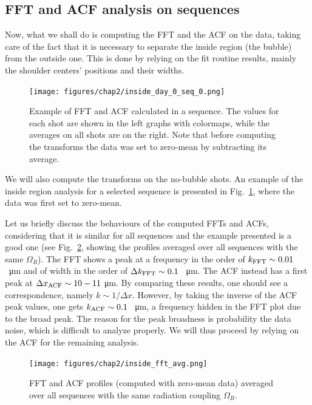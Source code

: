 \subsection{FFT and ACF analysis on sequences}
Now, what we shall do is computing the FFT and the ACF on the data, taking care of the fact that it is necessary to separate the inside region (the bubble) from the outside one. This is done by relying on the fit routine results, mainly the shoulder centers' positions and their widths.
\begin{figure}[h!]
    \centering
    \texttt{[image: figures/chap2/inside\_day\_0\_seq\_0.png]}
    \caption{Example of FFT and ACF calculated in a sequence. The values for each shot are shown in the left graphs with colormaps, while the averages on all shots are on the right. Note that before computing the transforms the data was set to zero-mean by subtracting its average.}
    \label{fig:inside_00}
\end{figure}
We will also compute the transforms on the no-bubble shots. An example of the inside region analysis for a selected sequence is presented in Fig.\ \ref{fig:inside_00}, where the data was first set to zero-mean.

Let us briefly discuss the behaviours of the computed FFTs and ACFs, considering that it is similar for all sequences and the example presented is a good one (see Fig.\ \ref{fig:inside_avg}, showing the profiles averaged over all sequences with the same $\Omega_R$). The FFT shows a peak at a frequency in the order of $k_{\rm FFT} \sim 0.01$ \unit{\per\micro\meter} and of width in the order of $\Delta k_{\rm FFT} \sim 0.1$ \unit{\per\micro\meter}. The ACF instead has a first peak at $\Delta x_{\rm ACF} \sim 10-11$ \unit{\micro\meter}. By comparing these results, one should see a correspondence, namely $k \sim 1/\Delta x$. However, by taking the inverse of the ACF peak values, one gets $k_{\rm ACF} \sim 0.1$ \unit{\per\micro\meter}, a frequency hidden in the FFT plot due to the broad peak. The reason for the peak broadness is probability the data noise, which is difficult to analyze properly. We will thus proceed by relying on the ACF for the remaining analysis.

\begin{figure}[t!]
    \centering
    \texttt{[image: figures/chap2/inside\_fft\_avg.png]}
    \caption{FFT and ACF profiles (computed with zero-mean data) averaged over all sequences with the same radiation coupling $\Omega_R$.}
    \label{fig:inside_avg}
\end{figure}


